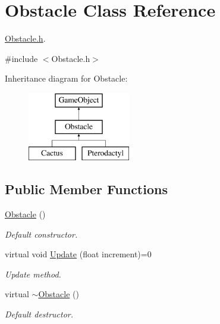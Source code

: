 \hypertarget{class_obstacle}{}\section{Obstacle Class Reference}
\label{class_obstacle}


\mbox{\hyperlink{_obstacle_8h_source}{Obstacle.\+h}}.  




{\ttfamily \#include $<$Obstacle.\+h$>$}

Inheritance diagram for Obstacle\+:\begin{figure}[H]
\begin{center}
\leavevmode
\includegraphics[height=3.000000cm]{class_obstacle}
\end{center}
\end{figure}
\subsection*{Public Member Functions}
\begin{DoxyCompactItemize}
\item 
\mbox{\hyperlink{class_obstacle_a8f734072321fa06a7b7dae2d5f50f352}{Obstacle}} ()
\begin{DoxyCompactList}\small\item\em Default constructor. \end{DoxyCompactList}\item 
virtual void \mbox{\hyperlink{class_obstacle_ad7bd00104a2c53cfb7421ca5986644af}{Update}} (float increment)=0
\begin{DoxyCompactList}\small\item\em Update method. \end{DoxyCompactList}\item 
\mbox{\label{class_obstacle_af2f9cc9c6cff75dca0974fd5ac4f71a9}} 
virtual \mbox{\hyperlink{class_obstacle_af2f9cc9c6cff75dca0974fd5ac4f71a9}{$\sim$\+Obstacle}} ()
\begin{DoxyCompactList}\small\item\em Default destructor. \end{DoxyCompactList}\end{DoxyCompactItemize}
